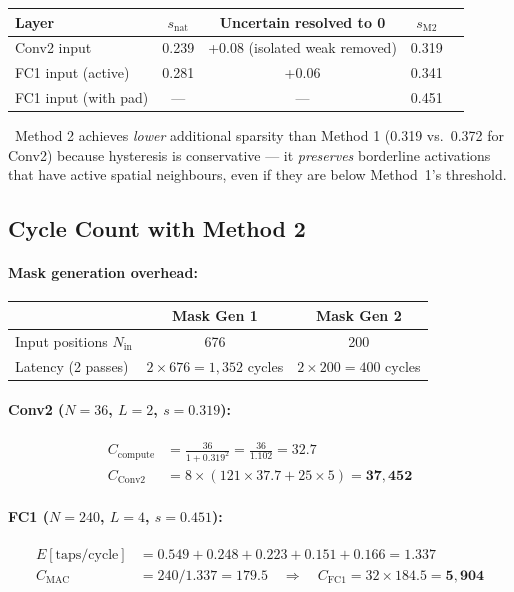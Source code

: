 \documentclass[11pt,a4paper]{article}
\begin{document}
\begin{center}
\begin{tabular}{lcccc}
\toprule
\textbf{Layer} & $s_{\text{nat}}$ & \textbf{Uncertain resolved to 0} & $s_{\text{M2}}$ \\
\midrule
Conv2 input & 0.239 & +0.08 (isolated weak removed) & 0.319 \\
FC1 input (active) & 0.281 & +0.06 & 0.341 \\
FC1 input (with pad) & — & — & 0.451 \\
\bottomrule
\end{tabular}
\end{center}

\noindent\ Method 2 achieves \emph{lower} additional sparsity than Method 1
(0.319 vs.\ 0.372 for Conv2) because hysteresis is conservative — it
\emph{preserves} borderline activations that have active spatial neighbours,
even if they are below Method~1's threshold.

\subsection{Cycle Count with Method 2}

\paragraph{Mask generation overhead:}
\begin{center}
\begin{tabular}{lcc}
\toprule
& \textbf{Mask Gen 1} & \textbf{Mask Gen 2} \\
\midrule
Input positions $N_{\text{in}}$ & 676 & 200 \\
Latency (2 passes) & $2 \times 676 = 1{,}352$ cycles & $2 \times 200 = 400$ cycles \\
\bottomrule
\end{tabular}
\end{center}

\paragraph{Conv2 ($N=36$, $L=2$, $s=0.319$):}
\begin{align}
C_{\text{compute}} &= \frac{36}{1 + 0.319^2} = \frac{36}{1.102}  = 32.7 \\
C_{\text{Conv2}} &= 8 \times (121 \times 37.7 + 25 \times 5) = \mathbf{37{,}452}
\end{align}

\paragraph{FC1 ($N=240$, $L=4$, $s=0.451$):}
\begin{align}
E[\text{taps/cycle}] &= 0.549 + 0.248 + 0.223 + 0.151 + 0.166 = 1.337 \\
C_{\text{MAC}} &= 240 / 1.337 = 179.5 \quad\Rightarrow\quad
C_{\text{FC1}} = 32 \times 184.5 = \mathbf{5{,}904}
\end{align}
\end{document}
